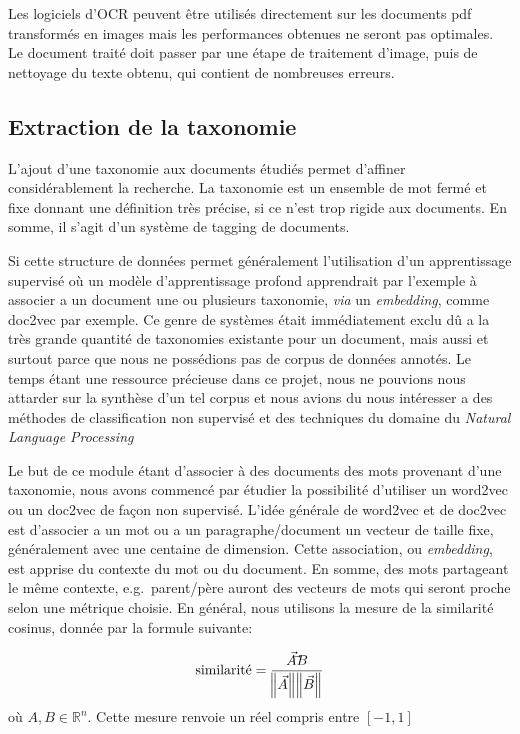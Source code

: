 Les logiciels d'OCR peuvent être utilisés directement sur les documents pdf transformés en images mais les performances obtenues ne seront pas optimales.
Le document traité doit passer par une étape de traitement d'image, puis de nettoyage du texte obtenu, qui contient de nombreuses erreurs.

\subsection{Extraction de la taxonomie}
L'ajout d'une taxonomie aux documents étudiés permet d'affiner considérablement la recherche.
La taxonomie est un ensemble de mot fermé et fixe donnant une définition très précise, si ce n'est trop rigide aux documents.
En somme, il s'agit d'un système de tagging de documents. 

Si cette structure de données permet généralement l'utilisation d'un apprentissage supervisé où un modèle d'apprentissage profond apprendrait par l'exemple à associer a un document une ou plusieurs taxonomie, \textit{via} un \textit{embedding}, comme doc2vec\cite{doc2vec} par exemple.
Ce genre de systèmes était immédiatement exclu dû a la très grande quantité de taxonomies existante pour un document, mais aussi et surtout parce que nous ne possédions pas de corpus de données annotés.
Le temps étant une ressource précieuse dans ce projet, nous ne pouvions nous attarder sur la synthèse d'un tel corpus et nous avions du nous intéresser a des méthodes de classification non supervisé et des techniques du domaine du \textit{Natural Language Processing}

Le but de ce module étant d'associer à des documents des mots provenant d'une taxonomie, nous avons commencé par étudier la possibilité d'utiliser un word2vec\cite{word2vec} ou un doc2vec de façon non supervisé.
L'idée générale de word2vec et de doc2vec est d'associer a un mot ou a un paragraphe/document un vecteur de taille fixe, généralement avec une centaine de dimension. Cette association, ou \textit{embedding}, est apprise du contexte du mot ou du document.
En somme, des mots partageant le même contexte, e.g.\ parent/père auront des vecteurs de mots qui seront proche selon une métrique choisie.
En général, nous utilisons la mesure de la similarité cosinus, donnée par la formule suivante:

\begin{equation}
	\text{similarité} = \frac{\vec{A} \dot \vec{B}}{\norm{\vec{A}}\norm{\vec{B}}}
	\label{eq:distCosine}
\end{equation}
où $A, B  \in \mathbb{R}^n$. Cette mesure renvoie un réel compris entre $[-1, 1]$

